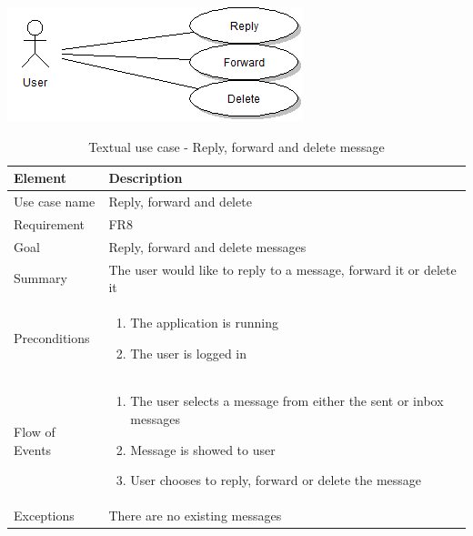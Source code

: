 \begin{table}
\begin{center}
\begin{center}
\includegraphics[width=\textwidth]{reply_forward_delete}
\end{center}
\begin{tabular}{p{3cm}|p{12cm}} \hline
\textbf{Element} & \textbf{Description} \\ \hline \hline
Use case name & Reply, forward and delete \\
Requirement & FR8	 \\
Goal & Reply, forward and delete messages\\
Summary & The user would like to reply to a message, forward it or delete it \\ \hline
Preconditions &
\begin{enumerate}
\item{}The application is running
\item{}The user is logged in
\end{enumerate} \\ \hline
Flow of Events &
\begin{enumerate}
\item{}The user selects a message from either the sent or inbox messages
\item{}Message is showed to user
\item{}User chooses to reply, forward or delete the message
\end{enumerate} \\ \hline
Exceptions & There are no existing messages\\ \hline
\end{tabular}
\end{center}
\caption{Textual use case - Reply, forward and delete message} \label{tab:reply}
\end{table}

